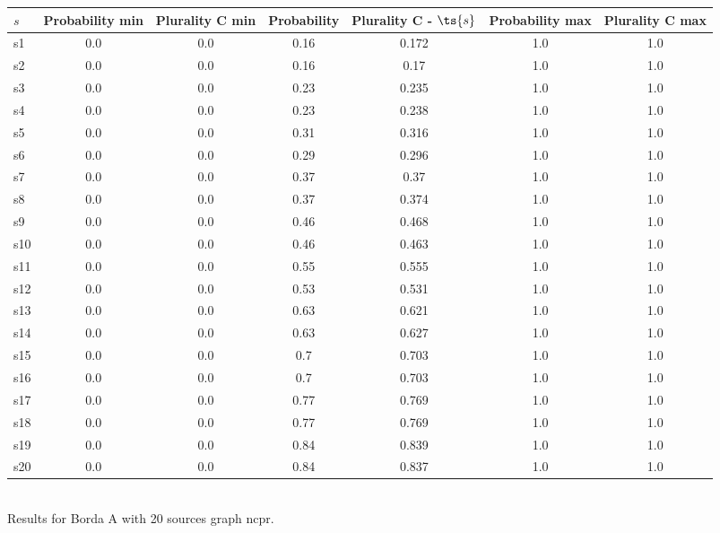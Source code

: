 \documentclass{article}
\begin{document}
\noindent\begin{tabular}{|l|c|c|c|c|c|c|}
\hline
$s$& Probability min & Plurality C min & Probability & Plurality C - $\ts{s}$ & Probability max & Plurality C max\\
\hline
s1 &0.0 & 0.0 & 0.16 & 0.172 & 1.0 & 1.0\\
\hline
s2 &0.0 & 0.0 & 0.16 & 0.17 & 1.0 & 1.0\\
\hline
s3 &0.0 & 0.0 & 0.23 & 0.235 & 1.0 & 1.0\\
\hline
s4 &0.0 & 0.0 & 0.23 & 0.238 & 1.0 & 1.0\\
\hline
s5 &0.0 & 0.0 & 0.31 & 0.316 & 1.0 & 1.0\\
\hline
s6 &0.0 & 0.0 & 0.29 & 0.296 & 1.0 & 1.0\\
\hline
s7 &0.0 & 0.0 & 0.37 & 0.37 & 1.0 & 1.0\\
\hline
s8 &0.0 & 0.0 & 0.37 & 0.374 & 1.0 & 1.0\\
\hline
s9 &0.0 & 0.0 & 0.46 & 0.468 & 1.0 & 1.0\\
\hline
s10 &0.0 & 0.0 & 0.46 & 0.463 & 1.0 & 1.0\\
\hline
s11 &0.0 & 0.0 & 0.55 & 0.555 & 1.0 & 1.0\\
\hline
s12 &0.0 & 0.0 & 0.53 & 0.531 & 1.0 & 1.0\\
\hline
s13 &0.0 & 0.0 & 0.63 & 0.621 & 1.0 & 1.0\\
\hline
s14 &0.0 & 0.0 & 0.63 & 0.627 & 1.0 & 1.0\\
\hline
s15 &0.0 & 0.0 & 0.7 & 0.703 & 1.0 & 1.0\\
\hline
s16 &0.0 & 0.0 & 0.7 & 0.703 & 1.0 & 1.0\\
\hline
s17 &0.0 & 0.0 & 0.77 & 0.769 & 1.0 & 1.0\\
\hline
s18 &0.0 & 0.0 & 0.77 & 0.769 & 1.0 & 1.0\\
\hline
s19 &0.0 & 0.0 & 0.84 & 0.839 & 1.0 & 1.0\\
\hline
s20 &0.0 & 0.0 & 0.84 & 0.837 & 1.0 & 1.0\\
\hline
\end{tabular}\\

\noindent Results for Borda A with 20 sources graph ncpr.
\end{document}
